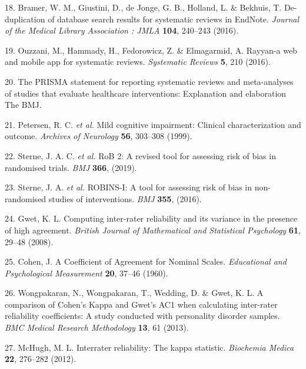 \documentclass[a4paper, twoside]{templates/ociamthesis}
\begin{document}
\leavevmode\hypertarget{ref-bramer2016}{}%
18. Bramer, W. M., Giustini, D., de Jonge, G. B., Holland, L. \& Bekhuis, T. De-duplication of database search results for systematic reviews in EndNote. \emph{Journal of the Medical Library Association : JMLA} \textbf{104}, 240--243 (2016).

\leavevmode\hypertarget{ref-ouzzani2016}{}%
19. Ouzzani, M., Hammady, H., Fedorowicz, Z. \& Elmagarmid, A. Rayyan-a web and mobile app for systematic reviews. \emph{Systematic Reviews} \textbf{5}, 210 (2016).

\leavevmode\hypertarget{ref-zotero-766}{}%
20. The PRISMA statement for reporting systematic reviews and meta-analyses of studies that evaluate healthcare interventions: Explanation and elaboration \textbar{} The BMJ.

\leavevmode\hypertarget{ref-petersen1999}{}%
21. Petersen, R. C. \emph{et al.} Mild cognitive impairment: Clinical characterization and outcome. \emph{Archives of Neurology} \textbf{56}, 303--308 (1999).

\leavevmode\hypertarget{ref-sterne2019}{}%
22. Sterne, J. A. C. \emph{et al.} RoB 2: A revised tool for assessing risk of bias in randomised trials. \emph{BMJ} \textbf{366}, (2019).

\leavevmode\hypertarget{ref-sterne2016}{}%
23. Sterne, J. A. \emph{et al.} ROBINS-I: A tool for assessing risk of bias in non-randomised studies of interventions. \emph{BMJ} \textbf{355}, (2016).

\leavevmode\hypertarget{ref-gwet2008}{}%
24. Gwet, K. L. Computing inter-rater reliability and its variance in the presence of high agreement. \emph{British Journal of Mathematical and Statistical Psychology} \textbf{61}, 29--48 (2008).

\leavevmode\hypertarget{ref-cohen1960}{}%
25. Cohen, J. A Coefficient of Agreement for Nominal Scales. \emph{Educational and Psychological Measurement} \textbf{20}, 37--46 (1960).

\leavevmode\hypertarget{ref-wongpakaran2013}{}%
26. Wongpakaran, N., Wongpakaran, T., Wedding, D. \& Gwet, K. L. A comparison of Cohen's Kappa and Gwet's AC1 when calculating inter-rater reliability coefficients: A study conducted with personality disorder samples. \emph{BMC Medical Research Methodology} \textbf{13}, 61 (2013).

\leavevmode\hypertarget{ref-mchugh2012}{}%
27. McHugh, M. L. Interrater reliability: The kappa statistic. \emph{Biochemia Medica} \textbf{22}, 276--282 (2012).
\end{document}
